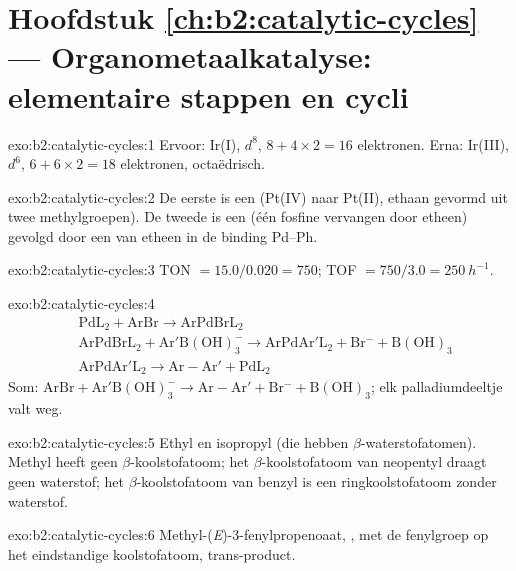 \section*{Hoofdstuk \ref{ch:b2:catalytic-cycles} --- Organometaalkatalyse: elementaire stappen en cycli}

\begin{solution}{exo:b2:catalytic-cycles:1}
Ervoor: Ir(I), $d^8$, $8 + 4 \times 2 = 16$ elektronen. Erna: Ir(III), $d^6$, $6 + 6 \times 2 = 18$
elektronen, octaëdrisch.
\end{solution}

\begin{solution}{exo:b2:catalytic-cycles:2}
De eerste is een  (Pt(IV) naar Pt(II), ethaan gevormd uit twee methylgroepen).
De tweede is een  (één fosfine vervangen door etheen) gevolgd door een
 van etheen in de binding Pd--Ph.
\end{solution}

\begin{solution}{exo:b2:catalytic-cycles:3}
TON $= 15.0/0.020 = 750$; TOF $= 750/3.0 = \qty{250}{h^{-1}}$.
\end{solution}

\begin{solution}{exo:b2:catalytic-cycles:4}
\begin{align*}
  &\mathrm{PdL_2 + ArBr \to ArPdBrL_2}\\
  &\mathrm{ArPdBrL_2 + Ar'B(OH)_3^- \to ArPdAr'L_2 + Br^- + B(OH)_3}\\
  &\mathrm{ArPdAr'L_2 \to Ar{-}Ar' + PdL_2}
\end{align*}
Som: $\mathrm{ArBr + Ar'B(OH)_3^- \to Ar{-}Ar' + Br^- + B(OH)_3}$; elk palladiumdeeltje
valt weg.
\end{solution}

\begin{solution}{exo:b2:catalytic-cycles:5}
Ethyl en isopropyl (die hebben $\beta$-waterstofatomen). Methyl heeft geen $\beta$-koolstofatoom; het $\beta$-koolstofatoom
van neopentyl draagt geen waterstof; het $\beta$-koolstofatoom van benzyl is een  ringkoolstofatoom zonder
waterstof.
\end{solution}

\begin{solution}{exo:b2:catalytic-cycles:6}
Methyl-(\textit{E})-3-fenylpropenoaat, , met de fenylgroep op het
eindstandige koolstofatoom, trans-product.
\end{solution}

